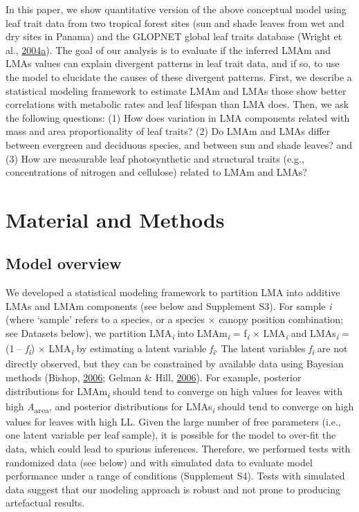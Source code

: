 \documentclass[12pt,]{article}
\theoremstyle{definition}
\theoremstyle{definition}
\theoremstyle{definition}
\theoremstyle{remark}
\begin{document}
In this paper, we show quantitative version of the above conceptual
model using leaf trait data from two tropical forest sites (sun and
shade leaves from wet and dry sites in Panama) and the GLOPNET global
leaf traits database (Wright et al.,
\protect\hyperlink{ref-Wright2004a}{2004}\protect\hyperlink{ref-Wright2004a}{a}).
The goal of our analysis is to evaluate if the inferred LMAm and LMAs
values can explain divergent patterns in leaf trait data, and if so, to
use the model to elucidate the causes of these divergent patterns.
First, we describe a statistical modeling framework to estimate LMAm and
LMAs those show better correlations with metabolic rates and leaf
lifespan than LMA does. Then, we ask the following questions: (1) How
does variation in LMA components related with mass and area
proportionality of leaf traits? (2) Do LMAm and LMAs differ between
evergreen and deciduous species, and between sun and shade leaves? and
(3) How are measurable leaf photosynthetic and structural traits (e.g.,
concentrations of nitrogen and cellulose) related to LMAm and LMAs?

\hypertarget{material-and-methods}{%
\section{Material and Methods}\label{material-and-methods}}

\hypertarget{model-overview}{%
\subsection{Model overview}\label{model-overview}}

We developed a statistical modeling framework to partition LMA into
additive LMAs and LMAm components (see below and Supplement S3). For
sample \emph{i} (where `sample' refers to a species, or a species ×
canopy position combination; see Datasets below), we partition
LMA\textsubscript{\emph{i}} into LMAm\textsubscript{\emph{i}} =
f\textsubscript{\emph{i}} × LMA\textsubscript{\emph{i}} and
LMAs\textsubscript{\emph{i}} = (1 -- \emph{f\textsubscript{i}}) ×
LMA\textsubscript{\emph{i}} by estimating a latent variable
\emph{f\textsubscript{i}}. The latent variables
\emph{f\textsubscript{i}} are not directly observed, but they can be
constrained by available data using Bayesian methods (Bishop,
\protect\hyperlink{ref-Bishop2006}{2006}; Gelman \& Hill,
\protect\hyperlink{ref-Gelman2006}{2006}). For example, posterior
distributions for LMAm\textsubscript{\emph{i}} should tend to converge
on high values for leaves with high \emph{A}\textsubscript{area}, and
posterior distributions for LMAs\textsubscript{\emph{i}} should tend to
converge on high values for leaves with high LL. Given the large number
of free parameters (i.e., one latent variable per leaf sample), it is
possible for the model to over-fit the data, which could lead to
spurious inferences. Therefore, we performed tests with randomized data
(see below) and with simulated data to evaluate model performance under
a range of conditions (Supplement S4). Tests with simulated data suggest
that our modeling approach is robust and not prone to producing
artefactual results.
\end{document}
